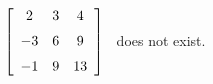 {$\left[ \begin {array}{ccc} 2&3&4\\\noalign{\medskip}-3&6&9
\\\noalign{\medskip}-1&9&13\end {array} \right]$ 
}
{\ttai\ does not exist.}
